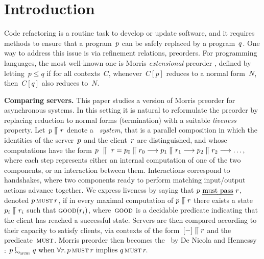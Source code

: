 \section{Introduction}
\label{sec:intro}
Code refactoring is a routine task to develop or update software, and
it requires methods to ensure that a program~$p$ can be safely
replaced by a program~$q$.  One way to address this issue is
via refinement relations, \ie preorders.  For programming languages,
the most well-known one is Morris \emph{extensional} preorder
\cite[pag.~$50$]{morris}, defined by letting~$p \leq q$ if for all
contexts~$C$, whenever~$C[p]$ reduces to a normal form~$N$,
then~$C[q]$ also reduces to~$N$.



{\bfseries Comparing servers.}
This paper studies a version of Morris preorder for
\nondeterministic asynchronous \svrclt systems.
In this setting it is natural to reformulate the preorder by replacing
reduction to normal forms (\ie termination) with a suitable
\emph{liveness} property.
Let~$p  \mathrel{\llceil}  r$ denote a {\em \svrclt\ system},
that is a parallel composition in which the identities of the
server~$p$ and the client~$r$ are distinguished, and
whose computations have the form
$
p~ \mathrel{\llceil} ~r =
p_0  \mathrel{\llceil}  r_0 \mathrel{\overset{ }\longrightarrow}
p_1  \mathrel{\llceil}  r_1 \mathrel{\overset{ }\longrightarrow}
p_2  \mathrel{\llceil}  r_2 \mathrel{\overset{ }\longrightarrow} \ldots,
$
where each step represents either an internal computation
of one of the two components, or an interaction between them.
Interactions correspond to handshakes, where
two components ready to perform matching input/output actions
advance together.
We express liveness by saying that  $p \text{ \emph{must pass} }
r$, denoted $ p  \operatorname{\textsc{must}}  r $, if in every maximal
computation of $p  \mathrel{\llceil}  r
$ there exists a state $p_i \mathrel{\llceil}  r_i$ such that
$\textsc{good}(r_i)$, where~$\textsc{good}$ is a decidable predicate
 indicating that the client has reached a successful state.
Servers are then compared according to their capacity to
satisfy clients, \ie via contexts of the form~$[-] \mathrel{\llceil} r$
and the predicate~$\operatorname{\textsc{must}}$.
Morris preorder %
then becomes the \mustpreorder\
by De Nicola and Hennessy~\cite{DBLP:journals/tcs/NicolaH84} :
$
  \serverA \testleqS \serverB \text{ when } \forall \client \wehavethat
  \Must{\serverA}{\client} \implies
  \Must{\serverB}{\client}.
  $


